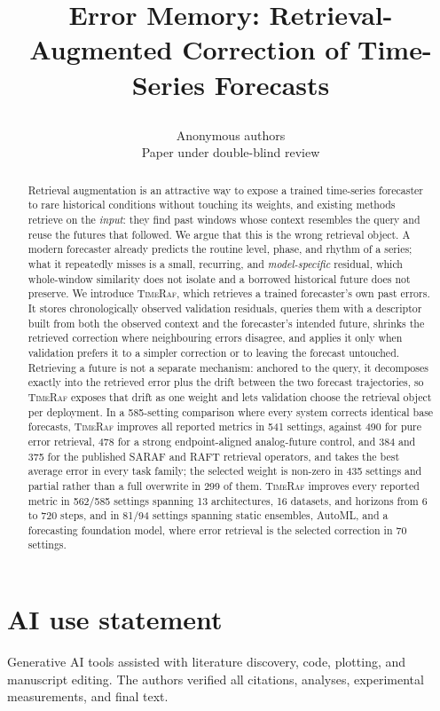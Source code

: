 \documentclass{article}
\title{\raggedright\hyphenpenalty=10000\exhyphenpenalty=10000\relax
Error Memory: Retrieval-Augmented Correction of
Time-Series Forecasts\par}
\author{Anonymous authors\\Paper under double-blind review}
\newcommand{\method}{\textsc{TimeRaf}}
\begin{document}
\maketitle

\begin{abstract}
Retrieval augmentation is an attractive way to expose a trained time-series
forecaster to rare historical conditions without touching its weights, and
existing methods retrieve on the \emph{input}: they find past windows whose
context resembles the query and reuse the futures that followed. We argue that
this is the wrong retrieval object. A modern forecaster already predicts the
routine level, phase, and rhythm of a series; what it repeatedly misses is a
small, recurring, and \emph{model-specific} residual, which whole-window
similarity does not isolate and a borrowed historical future does not preserve.
We introduce \method{}, which retrieves a trained forecaster's own past errors.
It stores chronologically observed validation residuals, queries them with a
descriptor built from both the observed context and the forecaster's intended
future, shrinks the retrieved correction where neighbouring errors disagree, and
applies it only when validation prefers it to a simpler correction or to leaving
the forecast untouched. Retrieving a future is not a separate mechanism: anchored
to the query, it decomposes exactly into the retrieved error plus the drift
between the two forecast trajectories, so \method{} exposes that drift as one
weight and lets validation choose the retrieval object per deployment. In a
585-setting comparison where every system corrects identical base forecasts,
\method{} improves all reported metrics in 541 settings, against 490 for pure
error retrieval, 478 for a strong endpoint-aligned analog-future control, and 384
and 375 for the published SARAF and RAFT retrieval operators, and takes the best
average error in every task family; the selected weight is non-zero in 435
settings and partial rather than a full overwrite in 299 of them. \method{} improves every
reported metric in 562/585 settings spanning 13 architectures, 16 datasets, and
horizons from 6 to 720 steps, and in 81/94 settings spanning static ensembles,
AutoML, and a forecasting foundation model, where error retrieval is the selected
correction in 70 settings.
\end{abstract}








\section*{AI use statement}
Generative AI tools assisted with literature discovery, code, plotting, and
manuscript editing. The authors verified all citations, analyses,
experimental measurements, and final text.




\appendix

\end{document}

